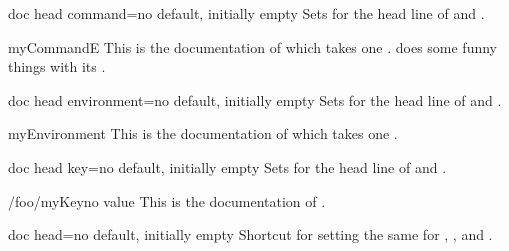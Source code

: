 \begin{docTcbKey}{doc head command}{=}{no default, initially empty}
  Sets  for the head line of  and .
\begin{dispExample}

\begin{docCommand*}{myCommandE}{}
  This is the documentation of  which takes one .
   does some funny things with its .
\end{docCommand*}
\end{dispExample}
\end{docTcbKey}

\begin{docTcbKey}{doc head environment}{=}{no default, initially empty}
  Sets  for the head line of  and .
\begin{dispExample}

\begin{docEnvironment*}{myEnvironment}{}
  This is the documentation of  which
  takes one .
\end{docEnvironment*}
\end{dispExample}
\end{docTcbKey}

\begin{docTcbKey}{doc head key}{=}{no default, initially empty}
  Sets  for the head line of  and .
\begin{dispExample}

\begin{docKey*}{/foo/myKey}{}{no value}
  This is the documentation of .
\end{docKey*}
\end{dispExample}
\end{docTcbKey}

\begin{docTcbKey}{doc head}{=}{no default, initially empty}
  Shortcut for setting the same  for
  , ,
  and .
\end{docTcbKey}

